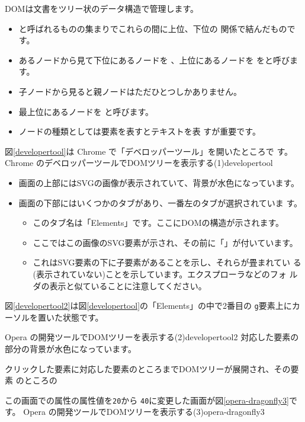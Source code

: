 DOMは文書をツリー状のデータ構造で管理します。
\begin{itemize}
 \item {}と呼ばれるものの集まりでこれらの間に上位、下位の
       関係で結んだものです。
 \item あるノードから見て下位にあるノードを
        、上位にあるノードを
       をと呼びます。
 \item 子ノードから見ると親ノードはただひとつしかありません。
 \item 最上位にあるノードを
       と呼びます。
 \item ノードの種類としては要素を表すとテキストを表
       すが重要です。
\end{itemize}
図\ref{developertool}は Chrome で「デベロッパーツール」を開いたところで
す。
{Chrome のデベロッパーツールでDOMツリーを表示する(1)}{developertool}
\begin{itemize}
 \item 画面の上部にはSVGの画像が表示されていて、背景が水色になっています。
 \item 画面の下部にはいくつかのタブがあり、一番左のタブが選択されていま
			 す。
 \begin{itemize}
	\item このタブ名は「Elements」です。ここにDOMの構造が示されます。
	\item ここではこの画像のSVG要素が示され、その前に「」が付いています。
	\item これはSVG要素の下に子要素があることを示し、それらが畳まれてい
				る(表示されていない)ことを示しています。エクスプローラなどのフォ
				ルダの表示と似ていることに注意してください。
 \end{itemize}
\end{itemize}
図\ref{developertool2}は図\ref{developertool}の「Elements」の中で2番目の
\texttt{g}要素上にカーソルを置いた状態です。

{Opera の開発ツールでDOMツリーを表示する(2)}{developertool2}
対応した要素の部分の背景が水色になっています。

クリックした要素に対応した要素のところまでDOMツリーが展開され、その要素
のところの

この画面での属性の属性値を\texttt{20}から
\texttt{40}に変更した画面が図\ref{opera-dragonfly3}です。
{Opera の開発ツールでDOMツリーを表示する(3)}{opera-dragonfly3}

